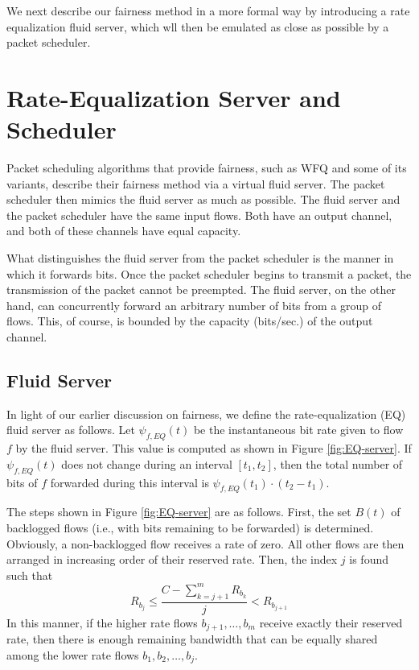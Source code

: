 \documentclass[conference]{IEEEtran}
\begin{document}
We next describe our fairness method in a more formal way by introducing a rate 
equalization fluid server, which wll then be emulated as close as possible by a 
packet scheduler.



%
\section{Rate-Equalization Server and Scheduler}
%

Packet scheduling algorithms that provide fairness, such as WFQ and some of its 
variants, describe their fairness method via a virtual fluid server.  The 
packet scheduler then mimics the fluid server as much as possible. The fluid 
server and the packet scheduler have the same input flows. Both have an output 
channel, and both of these channels have equal capacity.

What distinguishes the fluid server from the packet scheduler is the manner in 
which it forwards bits. Once the packet scheduler begins to transmit a packet, 
the transmission of the packet cannot be preempted. The fluid server, on the 
other hand, can concurrently forward an arbitrary number of bits from a group 
of flows. This, of course, is bounded by the capacity (bits/sec.) of the output 
channel.

\subsection{Fluid Server}

In light of our earlier discussion on fairness, we define the rate-equalization 
(EQ) fluid server as follows. Let $\psi_{f,EQ}(t)$ be the instantaneous bit 
rate given to flow $f$ by the fluid server. This value is computed as shown in 
Figure \ref{fig:EQ-server}. If $\psi_{f,EQ}(t)$ does not change during an 
interval $[t_1, t_2]$, then the total number of bits of $f$ forwarded during 
this interval is $\psi_{f,EQ}(t_1)\cdot(t_2-t_1)$.

The steps shown in Figure \ref{fig:EQ-server} are as follows. First, the set 
$B(t)$ of backlogged flows (i.e., with bits remaining to be forwarded) is 
determined. Obviously, a non-backlogged flow receives a rate of zero. All other 
flows are then arranged in increasing order of their reserved rate. Then, the 
index $j$ is found such that
\[ R_{b_j} \leq \frac{C - \sum_{k=j+1}^{m}R_{b_k}}{j} < R_{b_{j+1}}
\]
In this manner, if the higher rate flows $b_{j+1}, \ldots , b_{m}$ receive 
exactly their reserved rate, then there is enough remaining bandwidth that can 
be equally shared among the lower rate flows $b_{1}, b_{2}, \ldots , b_{j}$.
\end{document}
